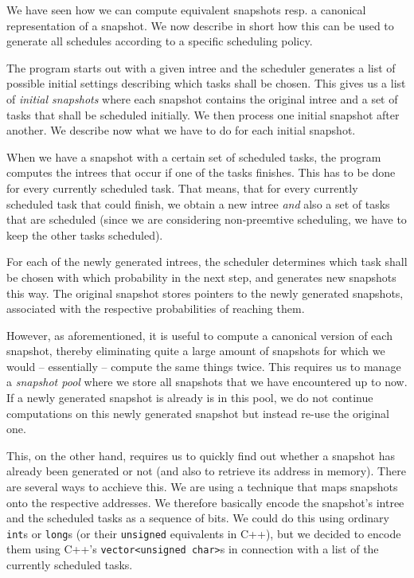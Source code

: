 We have seen how we can compute equivalent snapshots resp. a canonical representation of a snapshot. We now describe in short how this can be used to generate all schedules according to a specific scheduling policy.

The program starts out with a given intree and the scheduler generates a list of possible initial settings describing which tasks shall be chosen. This gives us a list of \emph{initial snapshots} where each snapshot contains the original intree and a set of tasks that shall be scheduled initially. We then process one initial snapshot after another. We describe now what we have to do for each initial snapshot.

When we have a snapshot with a certain set of scheduled tasks, the program computes the intrees that occur if one of the tasks finishes. This has to be done for every currently scheduled task. That means, that for every currently scheduled task that could finish, we obtain a new intree \emph{and} also a set of tasks that are scheduled (since we are considering non-preemtive scheduling, we have to keep the other tasks scheduled).

For each of the newly generated intrees, the scheduler determines which task shall be chosen with which probability in the next step, and generates new snapshots this way. The original snapshot stores pointers to the newly generated snapshots, associated with the respective probabilities of reaching them.

However, as aforementioned, it is useful to compute a canonical version of each snapshot, thereby eliminating quite a large amount of snapshots for which we would -- essentially -- compute the same things twice. This requires us to manage a \emph{snapshot pool} where we store all snapshots that we have encountered up to now. If a newly generated snapshot is already is in this pool, we do not continue computations on this newly generated snapshot but instead re-use the original one.

This, on the other hand, requires us to quickly find out whether a snapshot has already been generated or not (and also to retrieve its address in memory). There are several ways to acchieve this. We are using a technique that maps snapshots onto the respective addresses. We therefore basically encode the snapshot's intree and the scheduled tasks as a sequence of bits. We could do this using ordinary \texttt{int}s or \texttt{long}s (or their \texttt{unsigned} equivalents in C++), but we decided to encode them using C++'s \texttt{vector<unsigned char>}s in connection with a list of the currently scheduled tasks.

